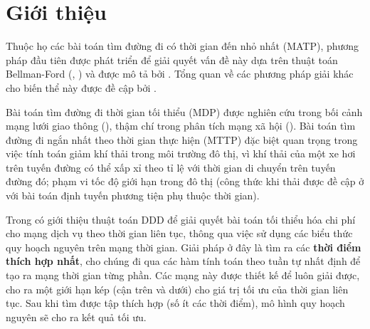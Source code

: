 \documentclass[../main.tex]{subfiles}
\begin{document}
\chapter{Giới thiệu}\label{introduce}


Thuộc họ các bài toán tìm đường đi có thời gian đến nhỏ nhất (MATP), phương pháp đầu
tiên được phát triển để giải quyết vấn đề này dựa trên thuật toán
Bellman-Ford (\cite{bellman1958routing}, \cite{ford2010flows}) và được mô tả bởi
\cite{cooke1966shortest}. Tổng quan về các phương pháp giải khác cho biến thể
này được đề cập bởi \cite{dean2004shortest}.

Bài toán tìm đường đi thời gian tối thiểu (MDP) được nghiên cứu trong bối cảnh mạng lưới giao thông (\cite{demiryurek2011online}), thậm chí trong phân tích mạng xã hội (\cite{gunturi2012information}).
Bài toán tìm đường đi ngắn nhất theo thời gian thực hiện (MTTP) đặc biệt quan trọng trong việc tính toán giảm khí thải trong môi trường đô thị, vì khí thải của một xe hơi trên tuyến đường có thể xấp xỉ
theo tỉ lệ với thời gian di chuyển trên tuyến đường đó; phạm vi tốc độ
giới hạn trong đô thị (công thức khi thải được đề cập ở \cite{jabali2012analysis} với bài toán định tuyến phương tiện phụ thuộc thời gian).

Trong \cite{boland2017continuous} có giới thiệu thuật toán DDD để giải quyết bài
toán tối thiểu hóa chi phí cho mạng dịch vụ theo thời gian liên tục,
thông qua việc sử dụng các biểu thức quy hoạch nguyên trên mạng thời
gian. Giải pháp ở đây là tìm ra các \textbf{thời điểm thích hợp nhất},
cho chúng đi qua các hàm tính toán theo tuần tự nhất định để tạo ra mạng
thời gian từng phần. Các mạng này được thiết kế để luôn giải được, cho
ra một giới hạn kép (cận trên và dưới) cho giá trị tối ưu của thời gian
liên tục. Sau khi tìm được tập thích hợp (số ít các thời điểm), mô hình
quy hoạch nguyên sẽ cho ra kết quả tối ưu.


\end{document}
